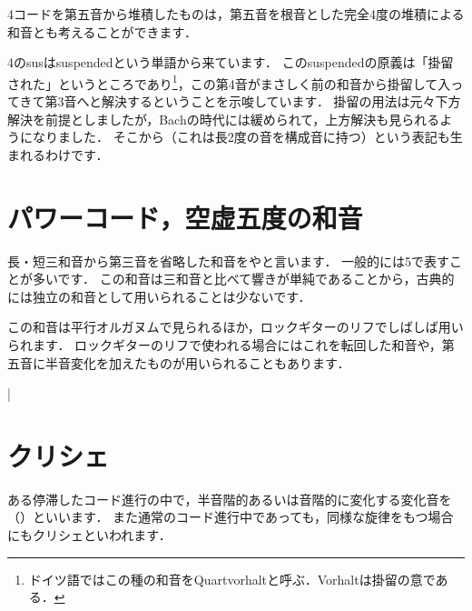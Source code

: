 \documentclass[dvipdfmx,uplatex,b5paper,openany,jbase=12Q,nomag*,textwidth-limit=44%
               ]{gachimuchi}
\begin{document}
\Sus4コードを第五音から堆積したものは，第五音を根音とした完全4度の堆積による和音とも考えることができます．
\begin{Yodan}
\Sus4のsusはsuspendedという単語から来ています．
このsuspendedの原義は「掛留された」というところであり\footnote{
  ドイツ語ではこの種の和音をQuartvorhaltと呼ぶ．Vorhaltは掛留の意である．
}，この第4音がまさしく前の和音から掛留して入ってきて第3音へと解決するということを示唆しています．
掛留の用法は元々下方解決を前提としましたが，Bachの時代には緩められて，上方解決も見られるようになりました．
そこから（これは長2度の音を構成音に持つ）という表記も生まれるわけです．
\end{Yodan}

\section{パワーコード，空虚五度の和音}
長・短三和音から第三音を省略した和音をやと言います．
一般的には\txCirc\subsc5で表すことが多いです．
この和音は三和音と比べて響きが単純であることから，古典的には独立の和音として用いられることは少ないです．

この和音は平行オルガヌムで見られるほか，ロックギターのリフでしばしば用いられます．
ロックギターのリフで使われる場合にはこれを転回した和音や，第五音に半音変化を加えたものが用いられることもあります．


\begin{Music}%
  \nostartrule%
  \Startpiece%
  \Notes%
  \en\doublebar%
  \Notes%
  \en\bar
  \Notes%
  \en\NOTes%
  \en\setdoublebar%
  \endpiece
\end{Music}

\section{クリシェ}
ある停滞したコード進行の中で，半音階的あるいは音階的に変化する変化音を
（）といいます．
また通常のコード進行中であっても，同様な旋律をもつ場合にもクリシェといわれます．
\end{document}
